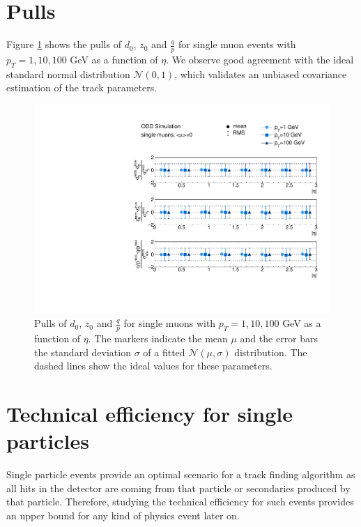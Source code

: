 \documentclass[10pt, paper=a4, UKenglish]{article}
\begin{document}
\section{Pulls}
\label{pulls}


Figure \ref{fig:pulls} shows the pulls of $d_0$, $z_0$ and $\frac{q}{p}$ for single muon events with $p_T=1,10,100$ GeV as a function of $\eta$. We observe good agreement with the ideal standard normal distribution $\mathcal{N}(0,1)$, which validates an unbiased covariance estimation of the track parameters.

\begin{figure}[htb!]
  \centering
  \includegraphics[width=0.6\linewidth]{figures/single_muon_pulls.pdf}
  \caption{Pulls of $d_0$, $z_0$ and $\frac{q}{p}$ for single muons with $p_T=1,10,100$ GeV as a function of $\eta$. The markers indicate the mean $\mu$ and the error bars the standard deviation $\sigma$ of a fitted $\mathcal{N}(\mu,\sigma)$ distribution. The dashed lines show the ideal values for these parameters.}
  \label{fig:pulls}
\end{figure}

\section{Technical efficiency for single particles}
\label{teff_single}

Single particle events provide an optimal scenario for a track finding algorithm as all hits in the detector are coming from that particle or secondaries produced by that particle. Therefore, studying the technical efficiency for such events provides an upper bound for any kind of physics event later on.
\end{document}
